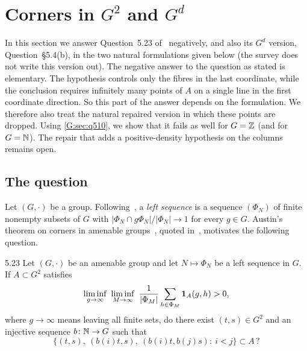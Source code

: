 
\section{Corners in \texorpdfstring{$G^2$}{G2} and \texorpdfstring{$G^d$}{Gd}}
\label{G:sec:q523}

In this section we answer Question~5.23 of~\cite{kra2023problems} negatively, and also its
$G^d$ version, Question~\S5.4(b), in the two natural formulations given below (the survey does
not write this version out). The negative answer to the question as stated is elementary.
The hypothesis controls only the fibres in the last coordinate, while the conclusion
requires infinitely many points of $A$ on a single line in the first coordinate
direction. So this part of the answer depends on the formulation. We therefore also
treat the natural repaired version in which these points are dropped. Using
\cref{G:sec:q510}, we show that it fails as well for $G=\mathbb{Z}$ (and for $G=\mathbb{N}$). The
repair that adds a positive-density hypothesis on the columns remains open.

\subsection{The question}
Let $(G,\cdot)$ be a group. Following~\cite[\S5.4]{kra2023problems}, a \emph{left \Fol{}
sequence} is a sequence $(\Phi_N)$ of finite nonempty subsets of $G$ with
$|\Phi_N\cap g\Phi_N|/|\Phi_N|\to1$ for every $g\in G$. Austin's theorem on corners in
amenable groups~\cite{austin2016nonconventional}, quoted
in~\cite[Theorem~5.22]{kra2023problems}, motivates the following question.

\begin{question}{5.23}\label{G:q:523}
Let $(G,\cdot)$ be an amenable group and let $N\mapsto\Phi_N$ be a left \Fol{} sequence in
$G$. If $A\subset G^2$ satisfies
\begin{equation}\label{G:eq:23}
\liminf_{g\to\infty}\ \liminf_{M\to\infty}\ \frac1{|\Phi_M|}\sum_{h\in\Phi_M}\one_A(g,h)>0,
\end{equation}
where $g\to\infty$ means leaving all finite sets, do there exist $(t,s)\in G^2$ and an
injective sequence $b\colon\mathbb{N}\to G$ such that
\begin{equation}\label{G:eq:corner}
\{(t,s),\ (b(i)t,s),\ (b(i)t,b(j)s):\ i<j\}\subset A\,?
\end{equation}
\end{question}

